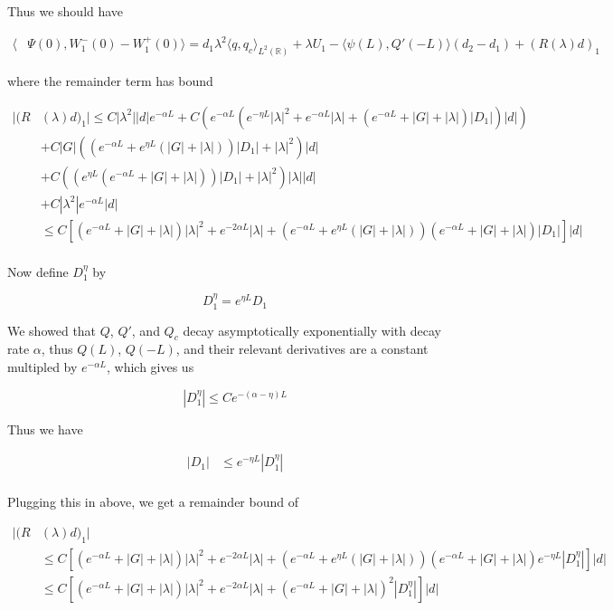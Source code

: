 \documentclass[12pt]{article}
\def\R{{\mathbb R}}
\begin{document}
Thus we should have

\begin{align*}
\langle &\Psi(0), W_1^-(0) - W_1^+(0) \rangle = d_1 \lambda^2 \langle q, q_c \rangle_{L^2(\R)} + \lambda U_1 - \langle \psi(L), Q'(-L) \rangle(d_2 - d_1) + (R(\lambda)d)_1
\end{align*}

where the remainder term has bound

\begin{align*}
|(R&(\lambda)d)_1| \leq C |\lambda^2| |d| e^{-\alpha L} + C \left( e^{-\alpha L} (e^{-\eta L}|\lambda|^2 + e^{-\alpha L}|\lambda| + (e^{-\alpha L} + |G| + |\lambda|)|D_1|)|d| \right) \\
&+ C|G| \left( \left( e^{-\alpha L} + e^{\eta L}(|G| + |\lambda|)  \right) |D_1| + |\lambda|^2 \right)|d| \\
&+ C \left(\left( e^{\eta L}(e^{-\alpha L} + |G| + |\lambda|) \right)|D_1| + |\lambda|^2 \right)|\lambda| |d| \\
&+ C |\lambda^2| e^{-\alpha L} |d| \\
&\leq C \left[ (e^{-\alpha L} + |G| + |\lambda|) |\lambda|^2 + e^{-2\alpha L}|\lambda| + (e^{-\alpha L} + e^{\eta L}(|G| + |\lambda|))(e^{-\alpha L} + |G| + |\lambda|) |D_1| \right] |d| \\
\end{align*}

Now define $D_1^{\eta}$ by

\[
D_1^{\eta} = e^{\eta L} D_1
\]

We showed that $Q$, $Q'$, and $Q_c$ decay asymptotically exponentially with decay rate $\alpha$, thus $Q(L)$, $Q(-L)$, and their relevant derivatives are a constant multipled by $e^{-\alpha L}$, which gives us

\[
|D_1^{\eta}| \leq C e^{-(\alpha - \eta)L}
\]

Thus we have

\begin{align*}
|D_1| &\leq e^{-\eta L} |D_1^{\eta}| \\
\end{align*}

Plugging this in above, we get a remainder bound of

\begin{align*}
|(R&(\lambda)d)_1|  \\
&\leq C \left[ (e^{-\alpha L} + |G| + |\lambda|) |\lambda|^2 + e^{-2\alpha L}|\lambda| +(e^{-\alpha L} + e^{\eta L}(|G| + |\lambda|))(e^{-\alpha L} + |G| + |\lambda|)e^{-\eta L} |D_1^{\eta}|  \right] |d| \\
&\leq C \left[ (e^{-\alpha L} + |G| + |\lambda|)|\lambda|^2 + e^{-2\alpha L}|\lambda| + (e^{-\alpha L} + |G| + |\lambda|)^2 |D_1^{\eta}|  \right] |d|
\end{align*}
\end{document}
